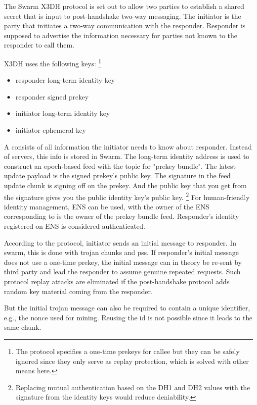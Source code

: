 The Swarm X3DH protocol is set out to allow two parties to establish a shared secret that is input to post-handshake two-way messaging. The initiator is the party that initiates a two-way communication with the responder. Responder is supposed to advertise the information necessary for parties not known to the responder to call them.

X3DH uses the following keys:%
%
\footnote{The protocol specifies a one-time prekeys for callee but they can be safely ignored since they only serve  as replay protection, which is solved with other means here.}

\begin{itemize}
\item responder long-term identity key
\item responder signed prekey
\item initiator long-term identity key
\item initiator ephemeral key
\end{itemize}{}

A  consists of all information the initiator needs to know about responder. Instead of servers, this info is stored in Swarm. The long-term identity address is used to construct an epoch-based feed with the topic for "prekey bundle". The latest update payload is the signed prekey's public key. The signature in the feed update chunk is signing off on the prekey. And the public key that you get from the signature gives you the public identity key's public key.%
% 
\footnote{Replacing mutual authentication based on the DH1 and DH2 values with the signature from the identity keys would reduce deniability.}
%
For human-friendly identity management, ENS can be used, with the owner of the ENS corresponding to is the owner of the prekey bundle feed. Responder's identity registered on ENS is considered authenticated.

According to the protocol,  initiator sends an initial message to responder. In swarm, this is done with trojan chunks and pss. If responder’s initial message does not use a one-time prekey, the initial message can in theory be re-sent by third party and lead the responder to assume genuine repeated requests. Such protocol replay attacks are eliminated if the post-handshake protocol adds random key material coming from the responder. 

But the initial trojan message can also be required to contain a unique identifier, e.g., the nonce used for mining. Reusing the id is not possible since it leads to
the same chunk.

